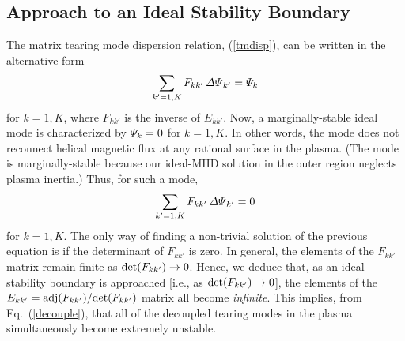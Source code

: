 \documentclass[12pt,prb,aps]{revtex4-1}
\begin{document}
\subsection{Approach to an Ideal Stability Boundary}\label{approach}
The matrix tearing mode dispersion relation, (\ref{tmdisp}), can be written in the alternative form\,\cite{am1}
\begin{equation}
\sum_{k'=1,K} F_{kk'}\,{\mit\Delta\Psi}_{k'} = {\mit\Psi}_k
\end{equation}
for $k=1,K$, where $F_{kk'}$ is the inverse of $E_{kk'}$. Now, a marginally-stable ideal mode is characterized by ${\mit\Psi}_k=0$ for $k=1,K$. In other words, the
mode does not reconnect helical magnetic flux at any rational surface in the plasma.  (The mode is marginally-stable
because our ideal-MHD solution in the outer region neglects plasma inertia.) Thus, for such a mode, 
\begin{equation}
\sum_{k'=1,K} F_{kk'}\,{\mit\Delta\Psi}_{k'} =0
\end{equation}
for $k=1,K$. The only way of finding a non-trivial solution of the previous equation is if the determinant of $F_{kk'}$ is zero. In general, the elements of
the $F_{kk'}$ matrix remain finite as ${\rm det}(F_{kk'})\rightarrow 0$.\cite{am1} Hence, we deduce that, as an ideal stability boundary is approached
[i.e., as ${\rm det}(F_{kk'})\rightarrow 0$], the elements of the $E_{kk'}= {\rm adj}(F_{kk'})/{\rm det}(F_{kk'})$ matrix  all become {\em infinite}. This implies, from Eq.~(\ref{decouple}), that all
of the decoupled tearing modes in the plasma simultaneously become extremely unstable.\cite{brennan,bren1,bren2} 
\end{document}
